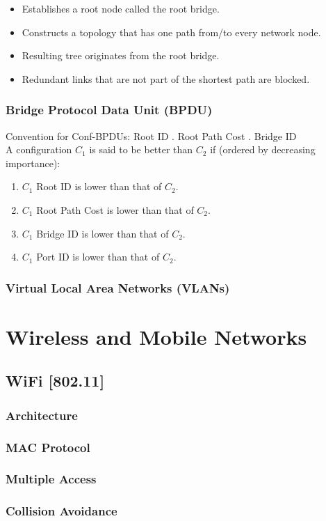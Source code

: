 \documentclass[12pt]{article}
\begin{document}
\begin{itemize}
    \item Establishes a root node called the root bridge.
    \item Constructs a topology that has one path from/to every network node.
    \item Resulting tree originates from the root bridge.
    \item Redundant links that are not part of the shortest path are blocked.
\end{itemize}

\subsubsection*{Bridge Protocol Data Unit (BPDU)}

Convention for Conf-BPDUs: Root ID . Root Path Cost . Bridge ID \\\newline
A configuration $C_1$ is said to be better than $C_2$ if (ordered by decreasing importance):

\begin{enumerate}[topsep=0pt, itemsep=0pt]
    \item $C_1$ Root ID is lower than that of $C_2$.
    \item $C_1$ Root Path Cost is lower than that of $C_2$.
    \item $C_1$ Bridge ID is lower than that of $C_2$.
    \item $C_1$ Port ID is lower than that of $C_2$.
\end{enumerate}

\subsubsection{Virtual Local Area Networks (VLANs)}

\newpage

\section{Wireless and Mobile Networks}

\subsection{WiFi [802.11]}

\subsubsection{Architecture}



\subsubsection{MAC Protocol}

\subsubsection*{Multiple Access}

\subsubsection*{Collision Avoidance}
\end{document}
